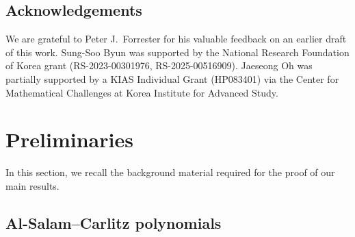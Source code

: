 \documentclass{amsart}
\theoremstyle{plain}
\theoremstyle{remark}
\numberwithin{equation}{section}
\begin{document}
\medskip 


 \subsection*{Acknowledgements} We are grateful to Peter J.~Forrester for his valuable feedback on an earlier draft of this work. Sung-Soo Byun was supported by the National Research Foundation of Korea grant (RS-2023-00301976, RS-2025-00516909). Jaeseong Oh was partially supported by a KIAS Individual Grant (HP083401) via the Center for Mathematical Challenges at Korea Institute for Advanced Study.


\medskip 






















































\section{Preliminaries}\label{Section_Prelim}

In this section, we recall the background material required for the proof of our main results.


\subsection{Al-Salam--Carlitz polynomials} \label{Subsection_Al-Salam poly}
\end{document}
